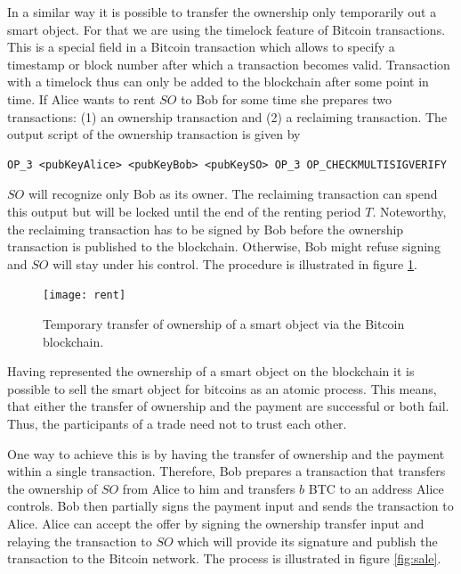 \documentclass[10pt, conference,compsoc]{IEEEtran}
\begin{document}
In a similar way it is possible to transfer the ownership only temporarily out a smart object. For that we are using the timelock feature of Bitcoin transactions. This is a special field in a Bitcoin transaction which allows to specify a timestamp or block number after which a transaction becomes valid. Transaction with a timelock thus can only be added to the blockchain after some point in time. If Alice wants to rent $SO$ to Bob for some time she prepares two transactions: (1) an ownership transaction and (2) a reclaiming transaction. The output script of the ownership transaction is given by

\begin{lstlisting}[breaklines=true]
OP_3 <pubKeyAlice> <pubKeyBob> <pubKeySO> OP_3 OP_CHECKMULTISIGVERIFY
\end{lstlisting}

$SO$ will recognize only Bob as its owner. The reclaiming transaction can spend this output but will be locked until the end of the renting period $T$. Noteworthy, the reclaiming transaction has to be signed by Bob before the ownership transaction is published to the blockchain. Otherwise, Bob might refuse signing and $SO$ will stay under his control. The procedure is illustrated in figure \ref{fig:rent}.

  \begin{figure}[!t]
    \centering
    \texttt{[image: rent]}
    \caption{Temporary transfer of ownership of a smart object via the Bitcoin blockchain.}
    \label{fig:rent}
  \end{figure}

Having represented the ownership of a smart object on the blockchain it is possible to sell the smart object for bitcoins as an atomic process. This means, that either the transfer of ownership and the payment are successful or both fail. Thus, the participants of a trade need not to trust each other. 

One way to achieve this is by having the transfer of ownership and the payment within a single transaction. Therefore, Bob prepares a transaction that transfers the ownership of $SO$ from Alice to him and transfers $b$ BTC to an address Alice controls. Bob then partially signs the payment input and sends the transaction to Alice. Alice can accept the offer by signing the ownership transfer input and relaying the transaction to $SO$ which will provide its signature and publish the transaction to the Bitcoin network. The process is illustrated in figure \ref{fig:sale}.
\end{document}

